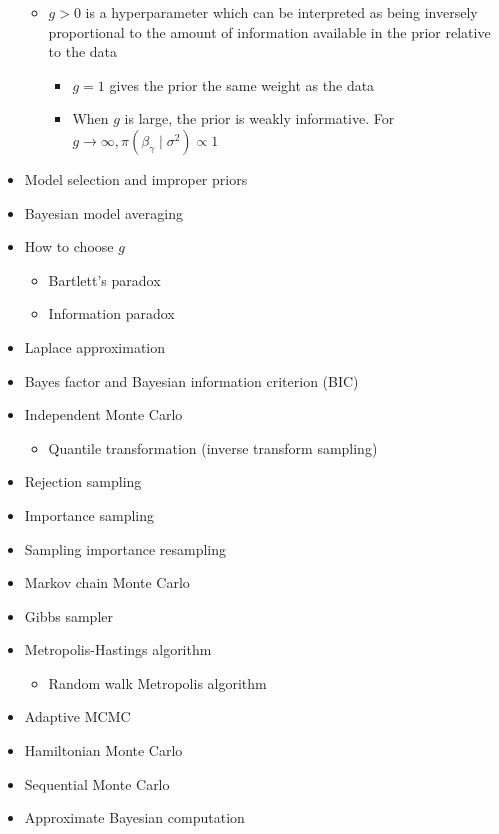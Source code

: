 \documentclass[a4paper]{article}
\begin{document}
\begin{itemize}
\begin{itemize}
        \item $g>0$ is a hyperparameter which can be interpreted as being inversely proportional to the amount of information available in the prior relative to the data
        \begin{itemize}
            \item $g=1$ gives the prior the same weight as the data
            \item When $g$ is large, the prior is weakly informative. For $g\to\infty, \pi(\beta_{\gamma}\mid\sigma^2)\propto 1$
        \end{itemize}
    \end{itemize}
    \item Model selection and improper priors
    \item Bayesian model averaging
    \item How to choose $g$
    \begin{itemize}
        \item Bartlett's paradox
        \item Information paradox
    \end{itemize}
    \item Laplace approximation
    \item Bayes factor and Bayesian information criterion (BIC)
    \item Independent Monte Carlo
    \begin{itemize}
        \item Quantile transformation (inverse transform sampling)
    \end{itemize}
    \item Rejection sampling
    \item Importance sampling
    \item Sampling importance resampling
    \item Markov chain Monte Carlo
    \item Gibbs sampler
    \item Metropolis-Hastings algorithm
    \begin{itemize}
        \item Random walk Metropolis algorithm
    \end{itemize}
    \item Adaptive MCMC
    \item Hamiltonian Monte Carlo
    \item Sequential Monte Carlo
    \item Approximate Bayesian computation
\end{itemize}
\end{document}
